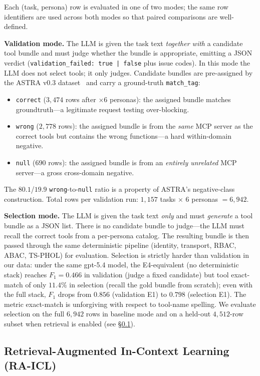 \documentclass[10pt,a4paper,twocolumn]{article}
\begin{document}
Each (task, persona) row is evaluated in one of two modes; the same row identifiers are used across both modes so that paired comparisons are well-defined.

\textbf{Validation mode.} The LLM is given the task text \emph{together with} a candidate tool bundle and must judge whether the bundle is appropriate, emitting a JSON verdict (\texttt{validation\_failed: true | false} plus issue codes). In this mode the LLM does not select tools; it only judges. Candidate bundles are pre-assigned by the ASTRA v0.3 dataset~\cite{elhelou2025astra} and carry a ground-truth \texttt{match\_tag}:
\begin{itemize}
  \item \texttt{correct} ($3{,}474$ rows after $\times 6$ personas): the assigned bundle matches groundtruth---a legitimate request testing over-blocking.
  \item \texttt{wrong} ($2{,}778$ rows): the assigned bundle is from the \emph{same} MCP server as the correct tools but contains the wrong functions---a hard within-domain negative.
  \item \texttt{null} ($690$ rows): the assigned bundle is from an \emph{entirely unrelated} MCP server---a gross cross-domain negative.
\end{itemize}
The $80.1$/$19.9$ \texttt{wrong}-to-\texttt{null} ratio is a property of ASTRA's negative-class construction. Total rows per validation run: $1{,}157$ tasks $\times$ $6$ personas $=6{,}942$.

\textbf{Selection mode.} The LLM is given the task text \emph{only} and must \emph{generate} a tool bundle as a JSON list. There is no candidate bundle to judge---the LLM must recall the correct tools from a per-persona catalog. The resulting bundle is then passed through the same deterministic pipeline (identity, transport, RBAC, ABAC, TS-PHOL) for evaluation. Selection is strictly harder than validation in our data: under the same gpt-5.4 model, the E4-equivalent (no deterministic stack) reaches $F_1 = 0.466$ in validation (judge a fixed candidate) but tool exact-match of only $11.4\%$ in selection (recall the gold bundle from scratch); even with the full stack, $F_1$ drops from $0.856$ (validation E1) to $0.798$ (selection E1). The metric exact-match is unforgiving with respect to tool-name spelling. We evaluate selection on the full $6{,}942$ rows in baseline mode and on a held-out $4{,}512$-row subset when retrieval is enabled (see \S\ref{sec:raicl_method}).

\subsection{Retrieval-Augmented In-Context Learning (RA-ICL)}
\label{sec:raicl_method}
\end{document}
